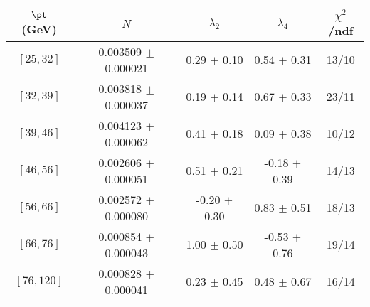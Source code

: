 \begin{tabular}{c||c|c|c|c}
$\pt$ (GeV) & $N$ & $\lambda_{2}$ & $\lambda_4$  & $\chi^2$/ndf  \\
\hline
$[25, 32]$ & 0.003509 $\pm$ 0.000021 & 0.29 $\pm$ 0.10 & 0.54 $\pm$ 0.31 & 13/10\\
$[32, 39]$ & 0.003818 $\pm$ 0.000037 & 0.19 $\pm$ 0.14 & 0.67 $\pm$ 0.33 & 23/11\\
$[39, 46]$ & 0.004123 $\pm$ 0.000062 & 0.41 $\pm$ 0.18 & 0.09 $\pm$ 0.38 & 10/12\\
$[46, 56]$ & 0.002606 $\pm$ 0.000051 & 0.51 $\pm$ 0.21 & -0.18 $\pm$ 0.39 & 14/13\\
$[56, 66]$ & 0.002572 $\pm$ 0.000080 & -0.20 $\pm$ 0.30 & 0.83 $\pm$ 0.51 & 18/13\\
$[66, 76]$ & 0.000854 $\pm$ 0.000043 & 1.00 $\pm$ 0.50 & -0.53 $\pm$ 0.76 & 19/14\\
$[76, 120]$ & 0.000828 $\pm$ 0.000041 & 0.23 $\pm$ 0.45 & 0.48 $\pm$ 0.67 & 16/14\\
\end{tabular}
